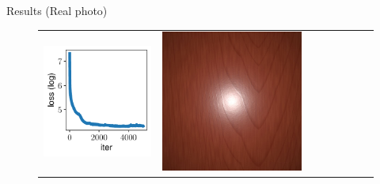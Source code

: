\documentclass[final]{beamer}
\newlength{\twocolwid}
\newlength{\resultwidth}
\begin{document}
\begin{frame}[t]
\begin{columns}[t]
\begin{column}{\twocolwid}
\begin{block}{Results (Real photo)}
\begin{figure}[t]
\begin{tabular}{ccrclccc}
            		\includegraphics[width=\resultwidth]{real/wood/loss.pdf} &
            		\includegraphics[width=\resultwidth]{real/wood/optim.jpg} &

\end{tabular}
\end{figure}
\end{block}
\end{column}
\end{columns}
\end{frame}
\end{document}
